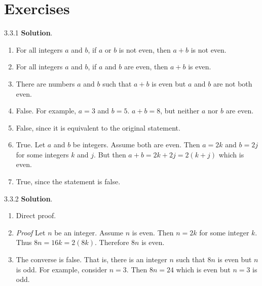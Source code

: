 \documentclass[11pt,]{book}
\makeatletter
\theoremstyle{ptxplainnotitle}
\theoremstyle{ptxplaintitle}
\renewcommand*{\proofname}{Proof}
\renewenvironment{proof}[1][\proofname]{\par
  \pushQED{\qed}%
  \normalfont \topsep6\p@\@plus6\p@\relax
  \trivlist
  \item\relax
    {\itshape
    #1\@addpunct{.}}\hspace\labelsep\ignorespaces
}{%
  \popQED\endtrivlist\@endpefalse
}
\theoremstyle{ptxdefinitionnotitle}
\theoremstyle{ptxdefinitiontitle}
\theoremstyle{ptxdefinitionnotitle}
\theoremstyle{ptxdefinitiontitle}
\theoremstyle{ptxdefinitionnotitle}
\theoremstyle{ptxdefinitiontitle}
\theoremstyle{ptxdefinitiontitlenonumber}
\theoremstyle{ptxdefinitiontitlenonumber}
\numberwithin{equation}{chapter}
\makeatother
\begin{document}
\section*{Exercises}
\begin{divisionexercise}{3.3.1}
\textbf{Solution}.\quad%
\hypertarget{p-2464}{}%
\leavevmode%
\begin{enumerate}[label=(\alph*)]
\item\hypertarget{li-1237}{}\hypertarget{p-2465}{}%
For all integers \(a\) and \(b\), if \(a\) or \(b\) is not even, then \(a+b\) is not even.%
\item\hypertarget{li-1238}{}\hypertarget{p-2466}{}%
For all integers \(a\) and \(b\), if \(a\) and \(b\) are even, then \(a+b\) is even.%
\item\hypertarget{li-1239}{}\hypertarget{p-2467}{}%
There are numbers \(a\) and \(b\) such that \(a+b\) is even but \(a\) and \(b\) are not both even.%
\item\hypertarget{li-1240}{}\hypertarget{p-2468}{}%
False. For example, \(a = 3\) and \(b = 5\). \(a+b = 8\), but neither \(a\) nor \(b\) are even.%
\item\hypertarget{li-1241}{}\hypertarget{p-2469}{}%
False, since it is equivalent to the original statement.%
\item\hypertarget{li-1242}{}\hypertarget{p-2470}{}%
True. Let \(a\) and \(b\) be integers. Assume both are even. Then \(a = 2k\) and \(b = 2j\) for some integers \(k\) and \(j\). But then \(a+b = 2k + 2j = 2(k+j)\) which is even.%
\item\hypertarget{li-1243}{}\hypertarget{p-2471}{}%
True, since the statement is false.%
\end{enumerate}
%
\end{divisionexercise}%
\begin{divisionexercise}{3.3.2}
\textbf{Solution}.\quad%
\hypertarget{p-2475}{}%
\leavevmode%
\begin{enumerate}[label=(\alph*)]
\item\hypertarget{li-1246}{}\hypertarget{p-2476}{}%
Direct proof. \begin{proof}\hypertarget{proof-31}{}
\hypertarget{p-2477}{}%
Let \(n\) be an integer. Assume \(n\) is even. Then \(n = 2k\) for some integer \(k\). Thus \(8n = 16k = 2(8k)\). Therefore \(8n\) is even.%
\end{proof}
%
\item\hypertarget{li-1247}{}\hypertarget{p-2478}{}%
The converse is false. That is, there is an integer \(n\) such that \(8n\) is even but \(n\) is odd. For example, consider \(n = 3\). Then \(8n = 24\) which is even but \(n = 3\) is odd.%
\end{enumerate}
%
\end{divisionexercise}%
\end{document}
